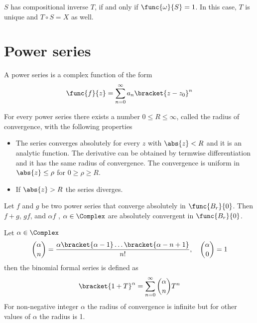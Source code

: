 \begin{theorem}
    \(S\) has compositional inverse \(T\), if and only if \(\func{\omega}{S} = 1\). In this case, \(T\) is unique and \(T\circ S = X\) as well.
\end{theorem}


\section{Power series}
A power series is a complex function of the form 
\begin{equation*}
      \func{f}{z} = \sum_{n = 0}^{\infty} a_n\bracket{z - z_0}^n
\end{equation*}

\begin{theorem} 
      For every power series there exists a number \(0 \leq R \leq \infty\), called the radius of convergence, with the following properties 
      \begin{itemize}
            \item The series converges absolutely for every \(z\) with \(\abs{z} < R\) and it is an analytic function. The derivative can be obtained by termwise differentiation and it has the same radius of convergence. The convergence is uniform in \(\abs{z} \leq \rho\) for \(0 \geq \rho \geq R\).
            \item If \(\abs{z} > R\) the series diverges.
      \end{itemize}
\end{theorem}

\begin{proposition}
    Let \(f\) and \(g\) be two power series that converge absolutely in \(\func{B_r}{0}\). Then \(f + g\), \(gf\), and \(\alpha f\) , \(\alpha \in \Complex\) are absolutely convergent in \(\func{B_r}{0}\).
\end{proposition}

\begin{example}
    Let \(\alpha \in \Complex\) 
    \begin{equation*}
        \binom{\alpha}{n} = \dfrac{\alpha \bracket{\alpha - 1} \dots \bracket{\alpha -n + 1}}{n!}, \quad \binom{\alpha}{0} = 1
    \end{equation*}
    then the binomial formal series is defined as 
    \begin{equation*}
        \bracket{1 + T}^{\alpha} = \sum_{n  = 0}^{\infty} \binom{\alpha}{n} T^n
    \end{equation*}
    For non-negative integer \(\alpha\) the radius of convergence is infinite but for other values of \(\alpha\) the radius is 1.
\end{example}

